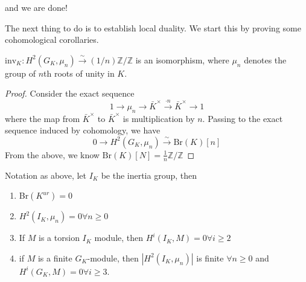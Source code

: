  and we are done!
 
 The next thing to do is to establish local duality. We start this by proving some cohomological corollaries. 
 
\begin{corollary}
$\text{inv}_K: H^2(G_K, \mu_n) \xrightarrow{\sim} (1/n)\mathbb{Z}/\mathbb{Z}$ is an isomorphism, where $\mu_n$ denotes the group of $n$th roots of unity in $K$.
\end{corollary}
\begin{proof}
Consider the exact sequence $$1\rightarrow \mu_n\rightarrow \bar{K}^\times\xrightarrow{\cdot n}\bar{K}^\times\rightarrow 1$$ where the map from $\bar{K}^\times$ to $\bar{K}^\times$ is multiplication by $n$. Passing to the exact sequence induced by cohomology, we have $$0\rightarrow H^2(G_K,\mu_n)\xrightarrow{\sim} \text{Br}(K)[n]$$ 
From the above, we know $\text{Br}(K)[N]=\frac{1}{n}\mathbb{Z}/\mathbb{Z}$
\end{proof}

\begin{corollary}
Notation as above, let $I_K$ be the inertia group, then
\begin{enumerate}
    \item Br$(K^{ur})=0$
    \item $H^2(I_K,\mu_n)=0\forall n\geq 0$
    \item If $M$ is a torsion $I_K$ module, then $H^i(I_K, M)=0\forall i\geq 2$
    \item if $M$ is a finite $G_K$-module, then $|H^2(I_K,\mu_n)|$ is finite $\forall n\geq 0$ and $H^i(G_K, M)=0\forall i\geq 3$.
\end{enumerate}
\end{corollary}



